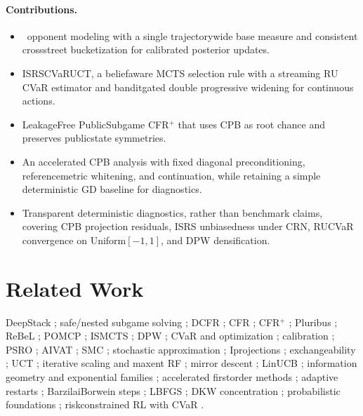 \paragraph{Contributions.}
\begin{itemize}
\item \sCRF\ opponent modeling with a single trajectory\textendash wide base measure and consistent cross\textendash street bucketization for calibrated posterior updates.
\item IS\textendash RS\textendash CVaR\textendash UCT, a belief\textendash aware MCTS selection rule with a streaming RU CVaR estimator and bandit\textendash gated double progressive widening for continuous actions.
\item Leakage\textendash Free Public\textendash Subgame CFR$^+$ that uses CPB as root chance and preserves public\textendash state symmetries.
\item An accelerated CPB analysis with fixed diagonal preconditioning, reference\textendash metric whitening, and continuation, while retaining a simple deterministic GD baseline for diagnostics.
\item Transparent deterministic diagnostics, rather than benchmark claims, covering CPB projection residuals, IS\textendash RS unbiasedness under CRN, RU\textendash CVaR convergence on Uniform$[-1,1]$, and DPW densification.
\end{itemize}

\section{Related Work}
DeepStack \cite{moravcik2017deepstack}; safe/nested subgame solving \cite{brown2018safe}; DCFR \cite{brown2019dcfr}; CFR \cite{zinkevich2007cfr}; CFR$^+$ \cite{tammelin2014cfrplus}; Pluribus \cite{brown2019pluribus}; ReBeL \cite{brown2020rebel}; POMCP \cite{silver2010pomcp}; ISMCTS \cite{cowling2012ismcts}; DPW \cite{couetoux2011dpw}; CVaR and optimization \cite{rockafellar2000cvar,chow2014cvar,tamar2015cvar}; calibration \cite{guo2017calibration}; PSRO \cite{lanctot2017psro}; AIVAT \cite{burch2018aivat}; SMC \cite{doucet2001smc}; stochastic approximation \cite{borkar2008sa}; I\textendash projections \cite{csiszar1975i}; exchangeability \cite{diaconis1980finite}; UCT \cite{kocsis2006uct}; iterative scaling and maxent RF \cite{darroch1972gis,dellapietra1997pami}; mirror descent \cite{beck2003mirror}; LinUCB \cite{li2010linucb}; information geometry and exponential families \cite{wainwright2008graphical,amari2016ig}; accelerated first\textendash order methods \cite{nesterov2004introductory}; adaptive restarts \cite{odonoghue2015restart}; Barzilai\textendash Borwein steps \cite{barzilai1988bb}; L\textendash BFGS \cite{liu1989lbfgs}; DKW concentration \cite{massart1990dkw}; probabilistic foundations \cite{kallenberg2002fmp}; risk\textendash constrained RL with CVaR \cite{chow2017riskjmlr}.

